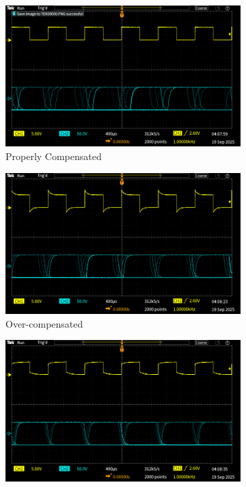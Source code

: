 \documentclass{article}
\begin{document}
\begin{figure}[H]
    \centering
    \begin{subfigure}[t]{0.32\textwidth}
        \includegraphics[width=\linewidth]{4.1a.full.png}
        \caption{Properly Compensated}
        \label{fig:full}
    \end{subfigure}
    \hfill
    \begin{subfigure}[t]{0.32\textwidth}
        \includegraphics[width=\linewidth]{4.1a.side1.png}
        \caption{Over-compensated}
        \label{fig:over}
    \end{subfigure}
    \hfill
    \begin{subfigure}[t]{0.32\textwidth}
        \includegraphics[width=\linewidth]{4.1a.side2.png}

\end{subfigure}
\end{figure}
\end{document}
